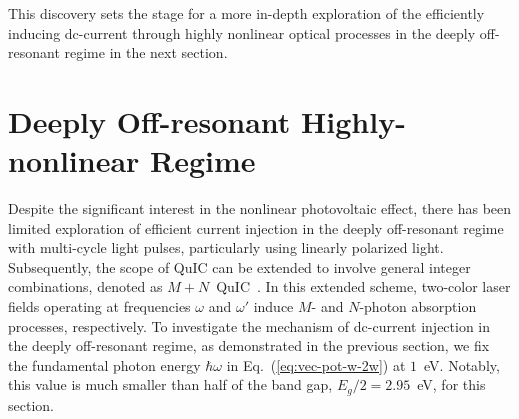  This discovery sets the stage for a more in-depth exploration of the efficiently inducing dc-current through highly nonlinear optical processes in the deeply off-resonant regime in the next section.


\section{Deeply Off-resonant Highly-nonlinear Regime \label{sec:nonperturbative}}

Despite the significant interest in the nonlinear photovoltaic effect, there has been limited exploration of efficient current injection in the deeply off-resonant regime with multi-cycle light pulses, particularly using linearly polarized light. Subsequently, the scope of \gls{QuIC} can be extended to involve general integer combinations, denoted as $M+N$~\gls{QuIC}~\cite{PhysRevB.100.075202,PhysRevLett.123.067402}. In this extended scheme, two-color laser fields operating at frequencies $\omega$ and $\omega'$ induce $M$- and $N$-photon absorption processes, respectively.
To investigate the mechanism of dc-current injection in the deeply off-resonant regime, as demonstrated in the previous section, we fix the fundamental photon energy $\hbar \omega$ in Eq.~(\ref{eq:vec-pot-w-2w}) at $1$~eV. Notably, this value is much smaller than half of the band gap, $E_g/2=2.95$~eV, for this section.

